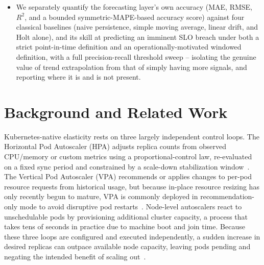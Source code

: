 \documentclass[conference]{IEEEtran}
\begin{document}
\begin{itemize}
  scaling responsiveness, cost efficiency, and stability with mean, standard deviation, and paired
  significance tests -- rather than single-run point estimates -- mirroring and extending the
  evaluation methodology of~\cite{ref_base}.
  \item We separately quantify the forecasting layer's own accuracy (MAE, RMSE, $R^2$, and a bounded
  symmetric-MAPE-based accuracy score) against four classical baselines (naive persistence, simple
  moving average, linear drift, and Holt alone), and its skill at predicting an imminent SLO breach
  under both a strict point-in-time definition and an operationally-motivated windowed definition, with
  a full precision-recall threshold sweep -- isolating the genuine value of trend extrapolation from
  that of simply having more signals, and reporting where it is and is not present.
\end{itemize}

\section{Background and Related Work}

Kubernetes-native elasticity rests on three largely independent control loops. The Horizontal Pod
Autoscaler (HPA) adjusts replica counts from observed CPU/memory or custom metrics using a
proportional-control law, re-evaluated on a fixed sync period and constrained by a scale-down
stabilization window~\cite{ref1}. The Vertical Pod Autoscaler (VPA) recommends or applies changes to
per-pod resource requests from historical usage, but because in-place resource resizing has only
recently begun to mature, VPA is commonly deployed in recommendation-only mode to avoid
disruptive pod restarts~\cite{ref13}. Node-level autoscalers react to unschedulable pods by
provisioning additional cluster capacity, a process that takes tens of seconds in practice due to
machine boot and join time. Because these three loops are configured and executed independently, a
sudden increase in desired replicas can outpace available node capacity, leaving pods pending and
negating the intended benefit of scaling out~\cite{ref17}.
\end{document}
